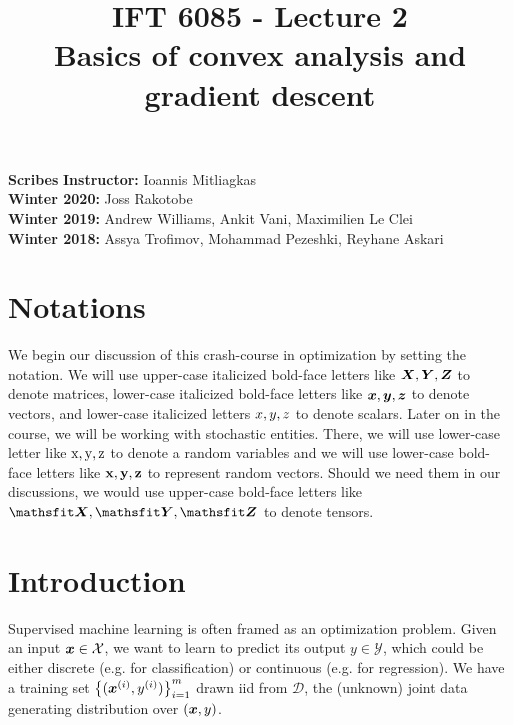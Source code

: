 \documentclass{article}
\title{IFT 6085 - Lecture 2 \\ 
Basics of convex analysis and gradient descent }
\date{}
\begin{document}
 

\maketitle


\textbf{Scribes}\hfill
\textbf{Instructor:}  Ioannis Mitliagkas\\
\textbf{Winter 2020:} Joss Rakotobe\\
\textbf{Winter 2019:} Andrew Williams, Ankit Vani, Maximilien Le Clei\\
\textbf{Winter 2018:} Assya Trofimov, Mohammad Pezeshki, Reyhane Askari



\newcommand{\infgc}{\inf_{g \in \mathcal{C}}}
\newcommand{\supgc}{\sup_{g \in \mathcal{C}}}

\section*{Notations}
\label{sec:notations}
We begin our discussion of this crash-course in optimization by setting the notation.
We will use upper-case italicized bold-face letters like ${\bm{X}}, {\bm{Y}}, {\bm{Z}}$ to denote matrices, lower-case italicized bold-face letters like ${\bm{x}}, {\bm{y}}, {\bm{z}}$ to denote vectors, and lower-case italicized letters ${x}, {y}, {z}$ to denote scalars.
Later on in the course, we will be working with stochastic entities.
There, we will use lower-case letter like ${\textnormal{x}}, {\textnormal{y}}, {\textnormal{z}}$ to denote a random variables and we will use lower-case bold-face letters like ${\mathbf{x}}, {\mathbf{y}}, {\mathbf{z}}$ to represent random vectors.
Should we need them in our discussions, we would use upper-case bold-face letters like $\tX, \tY, \tZ$ to denote tensors.

\section{Introduction}
\label{sec:introduction}
Supervised machine learning is often framed as an optimization problem. 
Given an input ${\bm{x}} \in \mathcal{X}$, we want to learn to predict its output $y \in \mathcal{Y}$, which could be either discrete (e.g. for classification) or continuous (e.g. for regression). 
We have a training set $\left\{ ({\bm{x}}^{(i)}, y^{(i)}) \right\}_{i=1}^m$ drawn iid from $\mathcal{D}$, the (unknown) joint data generating distribution over $({\bm{x}}, y)$.
\end{document}
